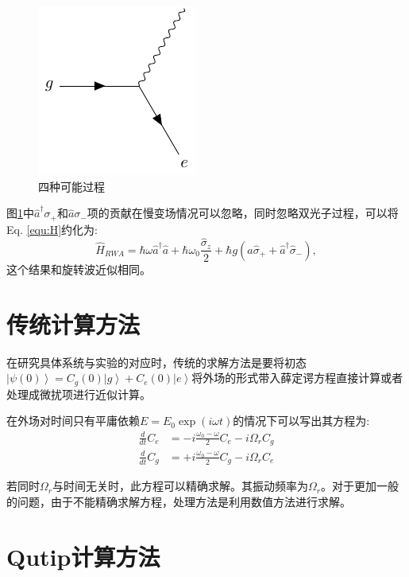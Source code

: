\documentclass{ctexart}
\begin{document}
\begin{figure}[htpb]
{\begin{minipage}[t]{0.45\linewidth}
            \includegraphics{fig4.pdf}
        \end{minipage}
    }%
    \caption{四种可能过程}
    \label{fig:4-process}
\end{figure}

图\ref{fig:4-process}中$\hat{a}^\dagger\sigma_+$和$\hat{a} \sigma_-$项的贡献在慢变场情况可以忽略，同时忽略双光子过程，可以将Eq. \ref{equ:H}约化为:
\begin{equation}
    \hat{H}_{RWA}=\hbar \omega \hat{a}^{\dagger} \hat{a}+\hbar \omega_{0} \frac{\hat{\sigma}_{z}}{2}+\hbar g\left(\hat{a}\hat{\sigma}_{+} +\hat{a}^{\dagger}\hat{\sigma}_{-} \right),
    \label{equ:H-RWA}
\end{equation}
这个结果和旋转波近似\cite{wu_strong-coupling_2007}相同。

\section{传统计算方法}
在研究具体系统与实验的对应时，传统的求解方法是要将初态$\left|\psi(0)\right> = C_g(0)\left|g\right> + C_e(0)\left|e\right>$将外场的形式带入薛定谔方程直接计算或者处理成微扰项进行近似计算。

在外场对时间只有平庸依赖$E = E_0 \exp(i\omega t)$的情况下可以写出其方程为:
\begin{equation}
    \begin{aligned}
        \frac{d}{d t} C_{e} & =-i \frac{\omega_{0}-\omega}{2} C_{e}-i \Omega_{r} C_{g} \\
        \frac{d}{d t} C_{g} & =+i \frac{\omega_{0}-\omega}{2} C_{g}-i \Omega_{r} C_{e}
    \end{aligned}
\end{equation}

若同时$\Omega_r$与时间无关时，此方程可以精确求解。其振动频率为$\Omega_r$。对于更加一般的问题，由于不能精确求解方程，处理方法是利用数值方法进行求解。

\section{Qutip计算方法}
\end{document}
